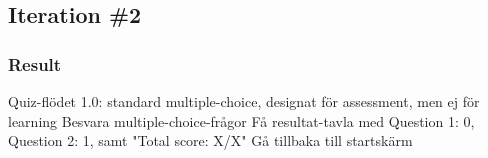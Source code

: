 \subsection{Iteration \#2}

  \subsubsection{Result}
  Quiz-flödet 1.0: standard multiple-choice, designat för assessment, men ej för learning
  Besvara multiple-choice-frågor
  Få resultat-tavla med Question 1: 0, Question 2: 1, samt "Total score: X/X"
  Gå tillbaka till startskärm
